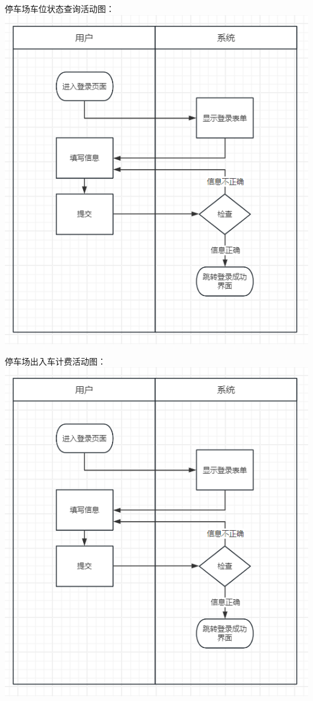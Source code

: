 \documentclass[]{article}
\begin{document}
停车场车位状态查询活动图：
\includegraphics{media/media/image1.png}

停车场出入车计费活动图：
\includegraphics{media/media/image1.png}
\end{document}
